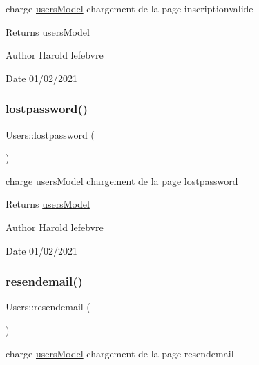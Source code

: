 charge \mbox{\hyperlink{classusers_model}{users\+Model}} chargement de la page inscriptionvalide 

\begin{DoxyReturn}{Returns}
\mbox{\hyperlink{classusers_model}{users\+Model}} 
\end{DoxyReturn}
\begin{DoxyAuthor}{Author}
Harold lefebvre 
\end{DoxyAuthor}
\begin{DoxyDate}{Date}
01/02/2021 
\end{DoxyDate}
\mbox{\label{class_users_a7358fdfb812ff2972432383f0956485e}} 
\subsubsection{\texorpdfstring{lostpassword()}{lostpassword()}}
{\footnotesize\ttfamily Users\+::lostpassword (\begin{DoxyParamCaption}{ }\end{DoxyParamCaption})}



charge \mbox{\hyperlink{classusers_model}{users\+Model}} chargement de la page lostpassword 

\begin{DoxyReturn}{Returns}
\mbox{\hyperlink{classusers_model}{users\+Model}} 
\end{DoxyReturn}
\begin{DoxyAuthor}{Author}
Harold lefebvre 
\end{DoxyAuthor}
\begin{DoxyDate}{Date}
01/02/2021 
\end{DoxyDate}
\mbox{\label{class_users_a4af43a0a0db01d442892d2d2c1b47eb5}} 
\subsubsection{\texorpdfstring{resendemail()}{resendemail()}}
{\footnotesize\ttfamily Users\+::resendemail (\begin{DoxyParamCaption}{ }\end{DoxyParamCaption})}



charge \mbox{\hyperlink{classusers_model}{users\+Model}} chargement de la page resendemail 

